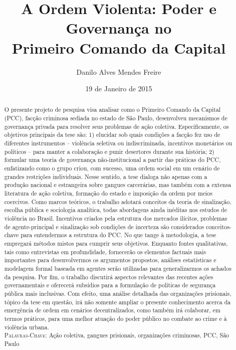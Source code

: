 \documentclass[a4paper,11pt]{article}
\title{A Ordem Violenta: Poder e Governança no\\ Primeiro Comando da Capital}
\author{Danilo Alves Mendes Freire}
\date{19 de Janeiro de 2015}
\begin{document}
\maketitle

\begin{abstract}
\onehalfspacing

O presente projeto de pesquisa visa analisar como o Primeiro Comando da Capital (PCC), facção criminosa sediada no estado de São Paulo, desenvolveu mecanismos de governança privada para resolver seus problemas de ação coletiva. Especificamente, os objetivos principais da tese são: 1) elucidar sob quais condições a facção fez uso de diferentes instrumentos -- violência seletiva ou indiscriminada, incentivos monetários ou políticos -- para manter a colaboração e punir desertores durante sua história; 2) formular uma teoria de governança não-institucional a partir das práticas do PCC, enfatizando como o grupo criou, com sucesso, uma ordem social em um cenário de grandes restrições individuais. Nesse sentido, a tese dialoga não apenas com a produção nacional e estrangeira sobre gangues carcerárias, mas também com a extensa literatura de ação coletiva, formação do estado e imposição da ordem por meios coercivos. Como marcos teóricos, o trabalho adotará conceitos da teoria de sinalização, escolha pública e sociologia analítica, todas abordagens ainda inéditas nos estudos de violência no Brasil. Incentivos criados pela estrutura dos mercados ilícitos, problemas de agente-principal e sinalização sob condições de incerteza são considerados conceitos-chave para entendermos a estrutura do PCC. No que tange à metodologia, a tese empregará métodos mistos para cumprir seus objetivos. Enquanto fontes qualitativas, tais como entrevistas em profundidade, fornecerão os elementos factuais mais importantes para desenvolvermos os argumentos propostos, análises estatísticas e modelagem formal baseada em agentes serão utilizadas para generalizarmos os achados da pesquisa. Por fim, o trabalho discutirá aspectos relevantes das recentes ações governamentais e oferecerá subsídios para a formulação de políticas de segurança pública mais inclusivas. Com efeito, uma análise detalhada das organizações prisionais, tópico da tese em questão, irá não somente ampliar o presente conhecimento acerca da emergência de ordem em cenários decentralizados, como também irá colaborar, em termos práticos, para uma melhor atuação do poder público no combate ao crime e à violência urbana.\\

\noindent
\textsc{Palavras-Chave}: Ação coletiva, gangues prisionais, organizações criminosas, PCC, São Paulo
\end{abstract}
\end{document}
